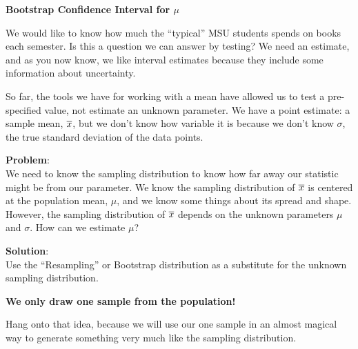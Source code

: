 \def\theTopic{Textbook Costs}
\def\dayNum{11 }


\begin{center}
{\bf {\large \textbf{Bootstrap  Confidence Interval for $\mu$}}}
\end{center}

We would like to know how much the ``typical'' MSU students spends on
books each semester.  Is this a question we can answer by testing?
  We need an estimate, and as you now know, we like interval
estimates because they include some information about uncertainty.

So far, the tools we have for working with a mean have allowed us to
test a pre-specified value, not estimate an unknown parameter.
We have a point estimate: a sample mean, $\overline{x}$, but we don't know how
variable it is because we don't know $\sigma$, the true standard
deviation of the data points. 

{\bf Problem}:\\
We need to know the sampling distribution to know how far away our
statistic might be from our parameter.  We know the sampling
distribution of $ \overline{x}$ is centered at the population mean, $\mu$, and
we know some things about its spread and shape.   However, the sampling
distribution  of $\overline{x}$ depends on the unknown parameters $\mu$ and $\sigma$. How
can we estimate $\mu$?  


{\bf Solution}:\\Use the ``Resampling'' or Bootstrap distribution as a
substitute for the unknown sampling distribution.
\vspace{-.2in}
\begin{center}
	{\bf\sf	We only draw {\bf one} sample from the population!}
\end{center}

Hang onto that idea, because we will use our one sample  in an almost
magical way to generate something very much like the sampling
distribution.   


